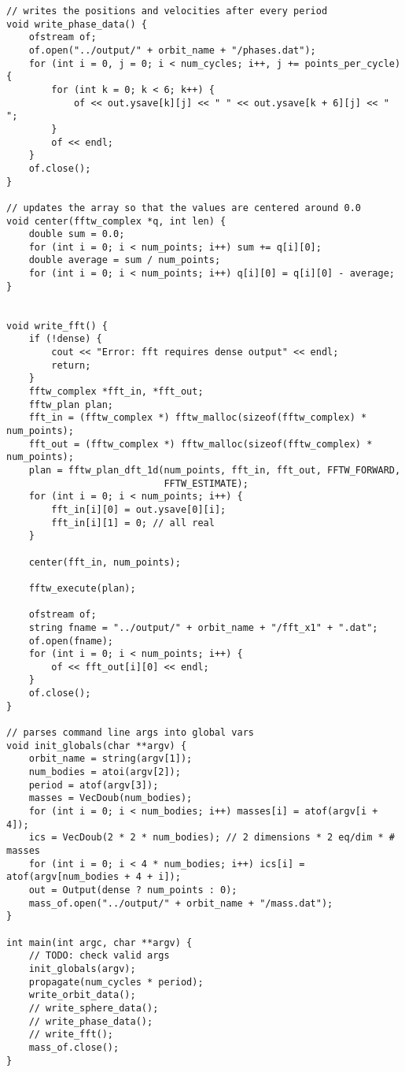 \documentclass[12pt]{article}
\begin{document}
\begin{lstlisting}
// writes the positions and velocities after every period
void write_phase_data() {
    ofstream of;
    of.open("../output/" + orbit_name + "/phases.dat");
    for (int i = 0, j = 0; i < num_cycles; i++, j += points_per_cycle) {
        for (int k = 0; k < 6; k++) {
            of << out.ysave[k][j] << " " << out.ysave[k + 6][j] << " ";
        }
        of << endl;
    }
    of.close();
}

// updates the array so that the values are centered around 0.0
void center(fftw_complex *q, int len) {
    double sum = 0.0;
    for (int i = 0; i < num_points; i++) sum += q[i][0];
    double average = sum / num_points;
    for (int i = 0; i < num_points; i++) q[i][0] = q[i][0] - average;
}


void write_fft() {
    if (!dense) {
        cout << "Error: fft requires dense output" << endl;
        return;
    }
    fftw_complex *fft_in, *fft_out;
    fftw_plan plan;
    fft_in = (fftw_complex *) fftw_malloc(sizeof(fftw_complex) * num_points);
    fft_out = (fftw_complex *) fftw_malloc(sizeof(fftw_complex) * num_points);
    plan = fftw_plan_dft_1d(num_points, fft_in, fft_out, FFTW_FORWARD,
                            FFTW_ESTIMATE);
    for (int i = 0; i < num_points; i++) {
        fft_in[i][0] = out.ysave[0][i];
        fft_in[i][1] = 0; // all real
    }

    center(fft_in, num_points);

    fftw_execute(plan);

    ofstream of;
    string fname = "../output/" + orbit_name + "/fft_x1" + ".dat";
    of.open(fname);
    for (int i = 0; i < num_points; i++) {
        of << fft_out[i][0] << endl;
    }
    of.close();
}

// parses command line args into global vars
void init_globals(char **argv) {
    orbit_name = string(argv[1]);
    num_bodies = atoi(argv[2]);
    period = atof(argv[3]);
    masses = VecDoub(num_bodies);
    for (int i = 0; i < num_bodies; i++) masses[i] = atof(argv[i + 4]);
    ics = VecDoub(2 * 2 * num_bodies); // 2 dimensions * 2 eq/dim * # masses
    for (int i = 0; i < 4 * num_bodies; i++) ics[i] = atof(argv[num_bodies + 4 + i]);
    out = Output(dense ? num_points : 0);
    mass_of.open("../output/" + orbit_name + "/mass.dat");
}

int main(int argc, char **argv) {
    // TODO: check valid args
    init_globals(argv);
    propagate(num_cycles * period);
    write_orbit_data();
    // write_sphere_data();
    // write_phase_data();
    // write_fft();
    mass_of.close();
}
\end{lstlisting}
\end{document}
